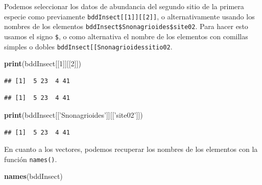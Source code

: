 \documentclass[
]{book}
\newenvironment{Shaded}{\begin{snugshade}}{\end{snugshade}}
\newcommand{\DecValTok}[1]{\textcolor[rgb]{0.00,0.00,0.81}{#1}}
\newcommand{\KeywordTok}[1]{\textcolor[rgb]{0.13,0.29,0.53}{\textbf{#1}}}
\newcommand{\NormalTok}[1]{#1}
\newcommand{\OperatorTok}[1]{\textcolor[rgb]{0.81,0.36,0.00}{\textbf{#1}}}
\newcommand{\StringTok}[1]{\textcolor[rgb]{0.31,0.60,0.02}{#1}}
\begin{document}
Podemos seleccionar los datos de abundancia del segundo sitio de la primera especie como previamente \texttt{bddInsect{[}{[}1{]}{]}{[}{[}2{]}{]}}, o alternativamente usando los nombres de los elementos \texttt{bddInsect\$Snonagrioides\$site02}. Para hacer esto usamos el signo \texttt{\$}, o como alternativa el nombre de los elementos con comillas simples o dobles \texttt{bddInsect{[}{[}\textquotesingle{}Snonagrioides\textquotesingle{}{]}{]}{[}{[}\textquotesingle{}sitio02\textquotesingle{}{]}{]}}.

\begin{Shaded}
\begin{Highlighting}[]
\KeywordTok{print}\NormalTok{(bddInsect[[}\DecValTok{1}\NormalTok{]][[}\DecValTok{2}\NormalTok{]])}
\end{Highlighting}
\end{Shaded}

\begin{verbatim}
## [1]  5 23  4 41
\end{verbatim}

\begin{Shaded}
\end{Shaded}

\begin{verbatim}
## [1]  5 23  4 41
\end{verbatim}

\begin{Shaded}
\begin{Highlighting}[]
\KeywordTok{print}\NormalTok{(bddInsect[[}\StringTok{'Snonagrioides'}\NormalTok{]][[}\StringTok{'site02'}\NormalTok{]])}
\end{Highlighting}
\end{Shaded}

\begin{verbatim}
## [1]  5 23  4 41
\end{verbatim}

En cuanto a los vectores, podemos recuperar los nombres de los elementos con la función \texttt{names()}.

\begin{Shaded}
\begin{Highlighting}[]
\KeywordTok{names}\NormalTok{(bddInsect)}
\end{Highlighting}
\end{Shaded}
\end{document}
